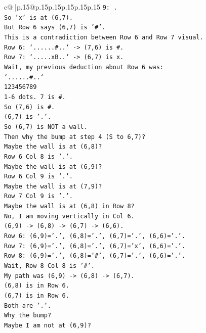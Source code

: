 \documentclass{article}
\begin{document}
{\begin{supertabular}{c@{$\;$}|p{.15\linewidth}@{}p{.15\linewidth}p{.15\linewidth}p{.15\linewidth}p{.15\linewidth}p{.15\linewidth}}
{{{\texttt{9: .} \\
\texttt{So 'x' is at (6,7).} \\
\texttt{But Row 6 says (6,7) is '\#'.} \\
\texttt{This is a contradiction between Row 6 and Row 7 visual.} \\
\texttt{Row 6: `......\#..` {-}> (7,6) is \#.} \\
\texttt{Row 7: `.....xB..` {-}> (6,7) is x.} \\
\texttt{Wait, my previous deduction about Row 6 was:} \\
\texttt{`......\#..`} \\
\texttt{123456789} \\
\texttt{1{-}6 dots. 7 is \#.} \\
\texttt{So (7,6) is \#.} \\
\texttt{(6,7) is '.'.} \\
\texttt{So (6,7) is NOT a wall.} \\
\texttt{Then why the bump at step 4 (S to 6,7)?} \\
\texttt{Maybe the wall is at (6,8)?} \\
\texttt{Row 6 Col 8 is '.'.} \\
\texttt{Maybe the wall is at (6,9)?} \\
\texttt{Row 6 Col 9 is '.'.} \\
\texttt{Maybe the wall is at (7,9)?} \\
\texttt{Row 7 Col 9 is '.'.} \\
\texttt{Maybe the wall is at (6,8) in Row 8?} \\
\texttt{No, I am moving vertically in Col 6.} \\
\texttt{(6,9) {-}> (6,8) {-}> (6,7) {-}> (6,6).} \\
\texttt{Row 6: (6,9)='.', (6,8)='.', (6,7)='.', (6,6)='.'.} \\
\texttt{Row 7: (6,9)='.', (6,8)='.', (6,7)='x', (6,6)='.'.} \\
\texttt{Row 8: (6,9)='.', (6,8)='\#', (6,7)='.', (6,6)='.'.} \\
\texttt{Wait, Row 8 Col 8 is '\#'.} \\
\texttt{My path was (6,9) {-}> (6,8) {-}> (6,7).} \\
\texttt{(6,8) is in Row 6.} \\
\texttt{(6,7) is in Row 6.} \\
\texttt{Both are '.'.} \\
\texttt{Why the bump?} \\
\texttt{Maybe I am not at (6,9)?} \\
}}}
\end{supertabular}}
\end{document}
